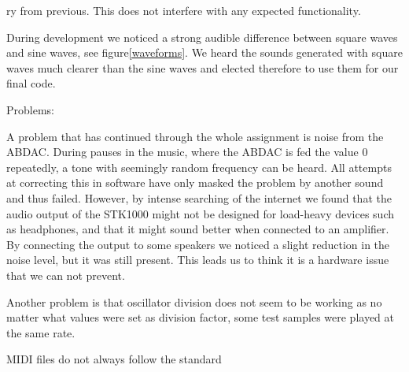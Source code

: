 \documentclass[a4paper,12pt]{article}
\begin{document}
                                                                                                                                                                                                                                                                                                                                                                                                                                                                                                                                                                                                                                                                                                                                                                                                                                                                                                                                                                                                                                                                                                                                                           ry from previous. This does not interfere with any expected functionality.      

During development we noticed a strong audible difference between square waves and sine waves, see figure\ref{waveforms}. We heard the sounds generated with square waves much clearer than the sine waves and elected therefore to use them for our final code.

Problems:

A problem that has continued through the whole assignment is noise from the ABDAC. During pauses in the music, where the ABDAC is fed the value 0 repeatedly, a tone with seemingly random frequency can be heard. All attempts at correcting this in software have only masked the problem by another sound and thus failed. However, by intense searching of the internet we found that the audio output of the STK1000 might not be designed for load-heavy devices such as headphones, and that it might sound better when connected to an amplifier\cite{impedance}. By connecting the output to some speakers we noticed a slight reduction in the noise level, but it was still present. This leads us to think it is a hardware issue that we can not prevent.

Another problem is that oscillator division does not seem to be working as no matter what values were set as division factor, some test samples were played at the same rate.

MIDI files do not always follow the standard
\end{document}
